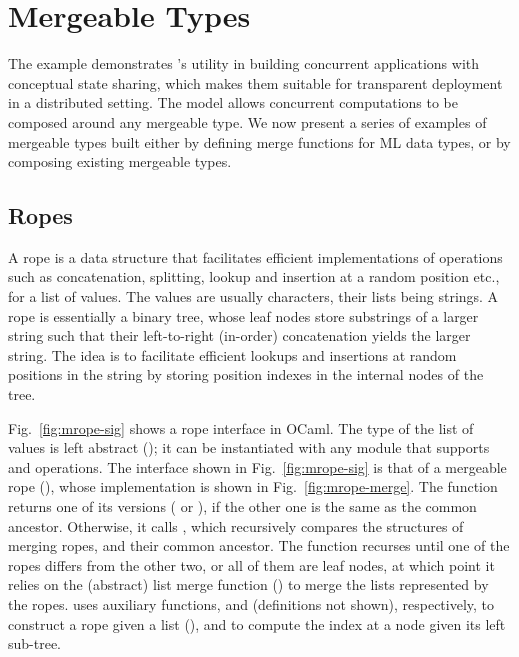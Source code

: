 \section{Mergeable Types}
\label{sec:mergeable_types}



The \drawsome example demonstrates \name's utility in building
concurrent applications with conceptual state sharing, which makes
them suitable for transparent deployment in a distributed setting. The
model allows concurrent computations to be composed around any
mergeable type. We now present a series of examples of mergeable types
built either by defining merge functions for ML data types, or by
composing existing mergeable types.

\subsection{Ropes}
\label{sec:ropes}

A rope is a data structure that facilitates efficient implementations
of operations such as concatenation, splitting, lookup and insertion
at a random position etc., for a list of values. The values are
usually characters, their lists being strings. A rope is essentially a
binary tree, whose leaf nodes store substrings of a larger string such
that their left-to-right (in-order) concatenation yields the larger
string. The idea is to facilitate efficient lookups and insertions at
random positions in the string by storing position indexes in the
internal nodes of the tree.

Fig.~\ref{fig:mrope-sig} shows a rope interface in OCaml. The type of
the list of values is left abstract (); it can be instantiated
with any module that supports  and  operations. The
interface shown in Fig.~\ref{fig:mrope-sig} is that of a mergeable
rope (), whose  implementation is shown in
Fig.~\ref{fig:mrope-merge}. The function returns one of its versions
( or ), if the other one is the same as the common ancestor.
Otherwise, it calls , which recursively compares the
structures of merging ropes, and their common ancestor.  The function
recurses until one of the ropes differs from the other two, or all of
them are leaf nodes, at which point it relies on the (abstract) list
merge function () to merge the lists represented by the
ropes.  uses auxiliary functions,  and
 (definitions not shown), respectively, to construct
a rope given a list (), and to compute the index at a node
given its left sub-tree.

